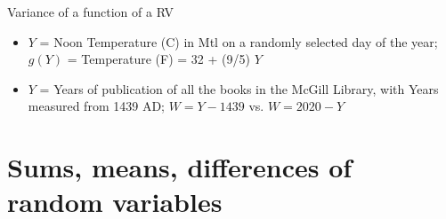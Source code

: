 \documentclass[10pt]{beamer}\usepackage[]{graphicx}\usepackage[]{color}
\begin{document}
\begin{frame}{Variance of a function of a RV}
	
\begin{itemize}
\setlength{\itemsep}{20pt}		
\item $Y$ = Noon Temperature (C) in Mtl on a randomly selected day of the year;  $g(Y)$ = Temperature (F) = 32 + (9/5) $Y$ \pause
\item $Y$ = Years of publication of all the books in the McGill Library, with Years measured from 1439 AD;  $W = Y - 1439$ vs. $W = 2020 - Y$
\end{itemize}	

\end{frame}




\section{Sums, means, differences of random variables}
\end{document}
